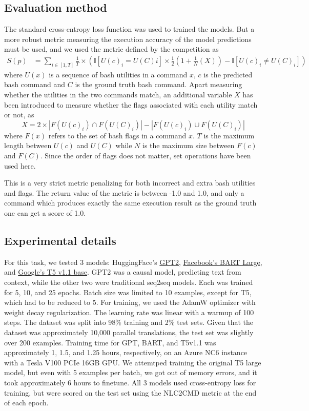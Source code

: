\documentclass{article}
\begin{document}
\subsection{Evaluation method}
The standard cross-entropy loss function was used to trained the models. But a more robust metric measuring the execution accuracy of the model predictions must be used, and we used the metric defined by the competition as
\begin{align*}
	S(p) & =\sum_{i\in[1,T]}\frac{1}{T}\times\left(
	\mathbb{I}[U(c)_i=U(C)i]\times\frac{1}{2}\left(
		1+\frac{1}{N}\left(X\right)\right) -\mathbb{I}[U(c)_i\ne U(C)_i]
	\right)
\end{align*}
where $U(x)$ is a sequence of bash utilities in a command $x$, $c$ is the
predicted bash command and $C$ is the ground truth bash command.
Apart measuring whether the utilities in the two commands match, an additional variable $X$ has been introduced to measure whether the flags associated with each utility match or not, as
\begin{equation*}
	X = 2\times
	|F(U(c)_i)\cap F(U(C)_i)| - |F(U(c)_i)\cup F(U(C)_i)|
\end{equation*}
where $F(x)$ refers to
the set of bash flags in a command $x$. $T$ is the maximum length between
$U(c)$ and $U(C)$ while $N$ is the maximum size between $F(c)$ and $F(C)$. Since the order of flags does not matter, set operations have been used here.

This is a very strict metric penalizing for both incorrect and extra bash utilities and flags. The return value of the metric is between -1.0 and 1.0, and only a command which produces exactly the same execution result as the ground truth one can get a score of 1.0.

\subsection{Experimental details}
For this task, we tested 3 models: HuggingFace's
\href{https://huggingface.co/gpt2}{GPT2}\cite{gpt2},
\href{https://huggingface.co/facebook/bart-large}{Facebook's BART
	Large}\cite{bart}, and \href{https://huggingface.co/google/t5-v1_1-base}{Google's T5 v1.1
	base}. GPT2 was a causal model, predicting text from context, while the other
two were traditional seq2seq models. Each was trained for 5, 10, and 25
epochs. Batch size was limited to 10 examples, except for T5, which had to be
reduced to 5. For training, we used the AdamW optimizer with weight decay
regularization. The learning rate was linear with a warmup of 100 steps. The
dataset was split into 98\% training and 2\% test sets. Given that the
dataset was approximately 10,000 parallel translations, the test set was
slightly over 200 examples. Training time for GPT, BART, and T5v1.1 was
approximately 1, 1.5, and 1.25 hours, respectively, on an Azure NC6 instance
with a Tesla V100 PCIe 16GB GPU. We attemtped training the original T5 large
model, but even with 5 examples per batch, we got out of memory errors, and
it took approximately 6 hours to finetune. All 3 models used cross-entropy
loss for training, but were scored on the test set using the NLC2CMD metric
at the end of each epoch.
\end{document}
